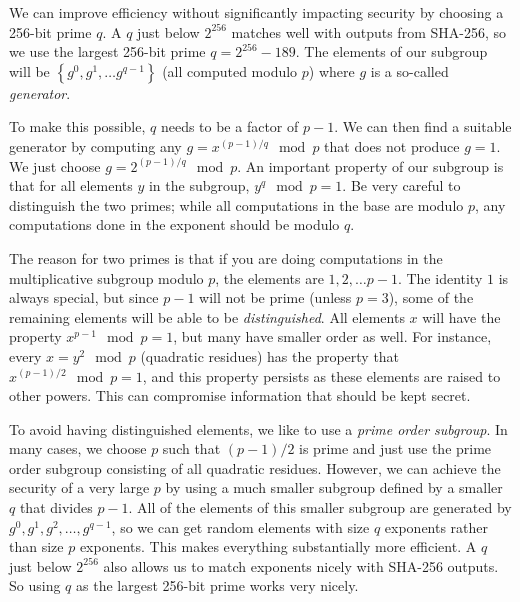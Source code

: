 We can improve efficiency without significantly impacting security by
choosing a 256-bit prime $q$. A $q$ just below $2^{256}$ matches well
with outputs from SHA-256, so we use the largest 256-bit prime
$q=2^{256}-189$. The elements of our subgroup will be
$\left\{g^0, g^1, \ldots g^{q-1}\right\}$ (all computed modulo $p$) where $g$ is
a so-called {\em generator}.

To make this possible, $q$ needs to be a factor of $p-1$.  We can then find a
suitable generator by computing any $g=x^{(p-1)/q} \mod p$ that does
not produce $g=1$.  We just
choose $g=2^{(p-1)/q} \mod p$.  An important property of our subgroup is that for all
elements $y$ in the subgroup, $y^q \mod p = 1$.  Be very careful to distinguish the two
primes; while all computations in the base are modulo $p$, any
computations done in the exponent should be modulo $q$.

The reason for two primes is that if you are doing computations in the
multiplicative subgroup modulo $p$, the elements are ${1,2,\ldots p-1}$. The
identity $1$ is always special, but since $p-1$ will not be prime (unless
$p=3$), some of the remaining elements will be able to be {\em distinguished}.
All elements $x$ will have the property $x^{p-1}\mod p = 1$, but many have
smaller order as well. For instance, every $x=y^2\mod p$ (quadratic
residues) has the property that $x^{(p-1)/2}\mod p = 1$, and this
property persists as these elements are raised to other powers. This
can compromise information that should be kept secret.
 

To avoid having distinguished elements, we like to use a {\em prime order
subgroup}. In many cases, we choose $p$ such that $(p-1)/2$ is prime and
just use the prime order subgroup consisting of all quadratic
residues. However, we can achieve the security of a very large $p$ by
using a much smaller subgroup defined by a smaller $q$ that divides
$p-1$. All of the elements of this smaller subgroup are generated by
$g^0,g^1, g^2,\ldots, g^{q-1}$, so we can get random elements with size $q$
exponents rather than size $p$ exponents. This makes everything
substantially more efficient. A $q$ just below $2^{256}$ also allows us to
match exponents nicely with SHA-256 outputs. So using $q$ as the largest
256-bit prime works very nicely.
\fi
 

